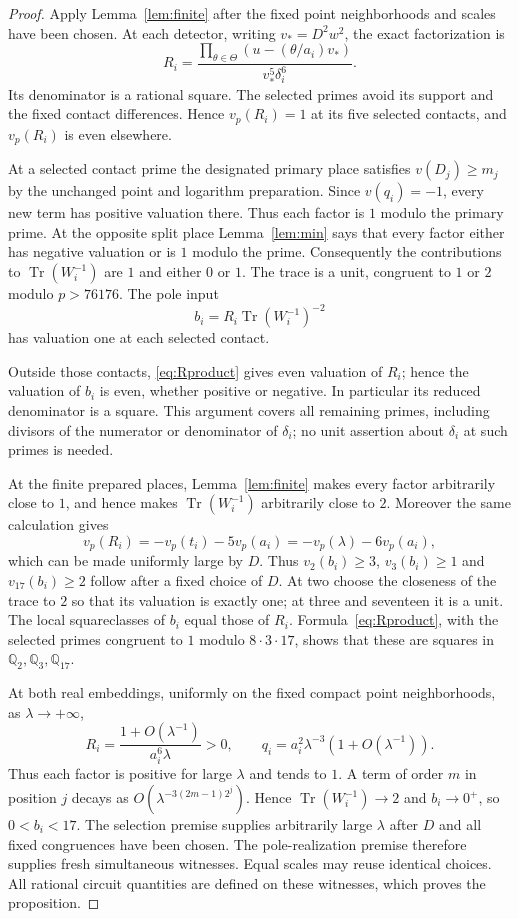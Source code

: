 \documentclass[11pt,a4paper]{article}
\theoremstyle{remark}\newtheorem{remark}[theorem]{Remark}
\newcommand{\Q}{\mathbb Q}\newcommand{\Z}{\mathbb Z}\newcommand{\HH}{\mathcal H}
\DeclareMathOperator{\Tr}{Tr}\DeclareMathOperator{\Nm}{N}
\begin{document}
\begin{proof}
Apply Lemma~\ref{lem:finite} after the fixed point neighborhoods and
scales have been chosen. At each detector, writing $v_*=D^2w^2$, the
exact factorization is
\begin{equation}\label{eq:Rproduct}
 R_i=\frac{\displaystyle\prod_{\theta\in\Theta}
                 (u-(\theta/a_i)v_*)}{v_*^5\delta_i^6}.
\end{equation}
Its denominator is a rational square. The selected primes avoid its
support and the fixed contact differences. Hence $v_p(R_i)=1$ at
its five selected contacts, and $v_p(R_i)$ is even elsewhere.

At a selected contact prime the designated primary place satisfies
$v(D_j)\ge m_j$ by the unchanged point and logarithm preparation.
Since $v(q_i)=-1$, every new term has positive valuation there.
Thus each factor is $1$ modulo the primary prime. At the opposite split
place Lemma~\ref{lem:min} says that every factor either has negative
valuation or is $1$ modulo the prime. Consequently the contributions
to $\Tr(W_i^{-1})$ are $1$ and either $0$ or $1$. The trace is a unit,
congruent to $1$ or $2$ modulo $p>76176$. The pole input
\[
 b_i=R_i\Tr(W_i^{-1})^{-2}
\]
has valuation one at each selected contact.

Outside those contacts, \eqref{eq:Rproduct} gives even valuation of
$R_i$; hence the valuation of $b_i$ is even, whether positive or negative.
In particular its reduced denominator is a square. This argument covers
all remaining primes, including divisors of the numerator or denominator
of $\delta_i$; no unit assertion about $\delta_i$ at such primes is needed.

At the finite prepared places, Lemma~\ref{lem:finite} makes every factor
arbitrarily close to $1$, and hence makes $\Tr(W_i^{-1})$ arbitrarily close
to $2$. Moreover the same calculation gives
\[
 v_p(R_i)=-v_p(t_i)-5v_p(a_i)
          =-v_p(\lambda)-6v_p(a_i),
\]
which can be made uniformly large by $D$. Thus $v_2(b_i)\ge3$,
$v_3(b_i)\ge1$ and $v_{17}(b_i)\ge2$ follow after a fixed choice of
$D$. At two choose the closeness of the trace to $2$ so that its valuation
is exactly one; at three and seventeen it is a unit. The local squareclasses
of $b_i$ equal those of $R_i$. Formula~\eqref{eq:Rproduct}, with the selected
primes congruent to $1$ modulo $8\cdot3\cdot17$, shows that these are
squares in $\Q_2,\Q_3,\Q_{17}$.

At both real embeddings, uniformly on the fixed compact point
neighborhoods, as $\lambda\to+\infty$,
\[
 R_i=\frac{1+O(\lambda^{-1})}{a_i^6\lambda}>0,\qquad
 q_i=a_i^2\lambda^{-3}(1+O(\lambda^{-1})).
\]
Thus each factor is positive for large $\lambda$ and tends to $1$.
A term of order $m$ in position $j$ decays as
$O(\lambda^{-3(2m-1)2^j})$. Hence
$\Tr(W_i^{-1})\to2$ and $b_i\to0^+$, so $0<b_i<17$.
The selection premise supplies arbitrarily large $\lambda$ after $D$
and all fixed congruences have been chosen. The pole-realization premise
therefore supplies fresh simultaneous witnesses. Equal scales may reuse
identical choices. All rational circuit quantities are defined on these
witnesses, which proves the proposition.
\end{proof}
\end{document}
